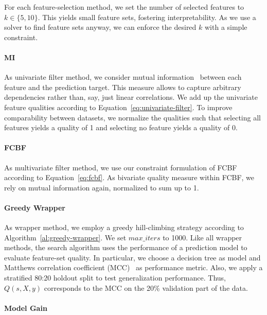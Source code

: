 \documentclass{article}
\theoremstyle{definition}
\begin{document}
For each feature-selection method, we set the number of selected features to $k \in \{5,10\}$.
This yields small feature sets, fostering interpretability.
As we use a solver to find feature sets anyway, we can enforce the desired $k$ with a simple constraint.

\paragraph{MI}

As univariate filter method, we consider mutual information~\cite{kraskov2004estimating} between each feature and the prediction target.
This measure allows to capture arbitrary dependencies rather than, say, just linear correlations.
We add up the univariate feature qualities according to Equation~\ref{eq:univariate-filter}.
To improve comparability between datasets, we normalize the qualities such that selecting all features yields a quality of 1 and selecting no feature yields a quality of 0.

\paragraph{FCBF}

As multivariate filter method, we use our constraint formulation of FCBF~\cite{yu2003feature} according to Equation~\ref{eq:fcbf}.
As bivariate quality measure within FCBF, we rely on mutual information again, normalized to sum up to 1.

\paragraph{Greedy Wrapper}

As wrapper method, we employ a greedy hill-climbing strategy according to Algorithm~\ref{al:greedy-wrapper}.
We set $max\_iters$ to 1000.
Like all wrapper methods, the search algorithm uses the performance of a prediction model to evaluate feature-set quality.
In particular, we choose a decision tree as model and Matthews correlation coefficient (MCC)~\cite{matthews1975comparison} as performance metric.
Also, we apply a stratified 80:20 holdout split to test generalization performance.
Thus, $Q(s,X,y)$ corresponds to the MCC on the 20\% validation part of the data.

\paragraph{Model Gain}
\end{document}
